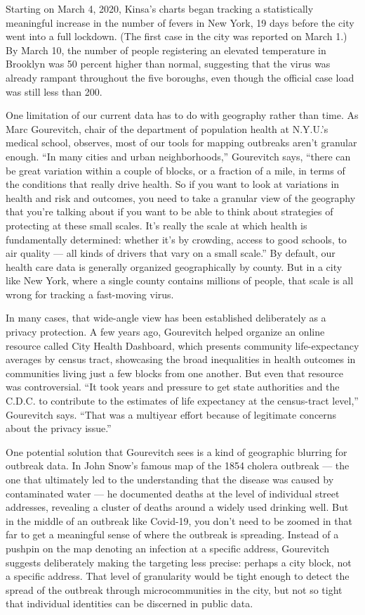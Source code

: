 Starting on March 4, 2020, Kinsa's charts began tracking a statistically
meaningful increase in the number of fevers in New York, 19 days before
the city went into a full lockdown. (The first case in the city was
reported on March 1.) By March 10, the number of people registering an
elevated temperature in Brooklyn was 50 percent higher than normal,
suggesting that the virus was already rampant throughout the five
boroughs, even though the official case load was still less than 200.

One limitation of our current data has to do with geography rather than
time. As Marc Gourevitch, chair of the department of population health
at N.Y.U.'s medical school, observes, most of our tools for mapping
outbreaks aren't granular enough. ``In many cities and urban
neighborhoods,'' Gourevitch says, ``there can be great variation within
a couple of blocks, or a fraction of a mile, in terms of the conditions
that really drive health. So if you want to look at variations in health
and risk and outcomes, you need to take a granular view of the geography
that you're talking about if you want to be able to think about
strategies of protecting at these small scales. It's really the scale at
which health is fundamentally determined: whether it's by crowding,
access to good schools, to air quality --- all kinds of drivers that
vary on a small scale.'' By default, our health care data is generally
organized geographically by county. But in a city like New York, where a
single county contains millions of people, that scale is all wrong for
tracking a fast-moving virus.

In many cases, that wide-angle view has been established deliberately as
a privacy protection. A few years ago, Gourevitch helped organize an
online resource called City Health Dashboard, which presents community
life-expectancy averages by census tract, showcasing the broad
inequalities in health outcomes in communities living just a few blocks
from one another. But even that resource was controversial. ``It took
years and pressure to get state authorities and the C.D.C. to contribute
to the estimates of life expectancy at the census-tract level,''
Gourevitch says. ``That was a multiyear effort because of legitimate
concerns about the privacy issue.''

One potential solution that Gourevitch sees is a kind of geographic
blurring for outbreak data. In John Snow's famous map of the 1854
cholera outbreak --- the one that ultimately led to the understanding
that the disease was caused by contaminated water --- he documented
deaths at the level of individual street addresses, revealing a cluster
of deaths around a widely used drinking well. But in the middle of an
outbreak like Covid-19, you don't need to be zoomed in that far to get a
meaningful sense of where the outbreak is spreading. Instead of a
pushpin on the map denoting an infection at a specific address,
Gourevitch suggests deliberately making the targeting less precise:
perhaps a city block, not a specific address. That level of granularity
would be tight enough to detect the spread of the outbreak through
microcommunities in the city, but not so tight that individual
identities can be discerned in public data.

